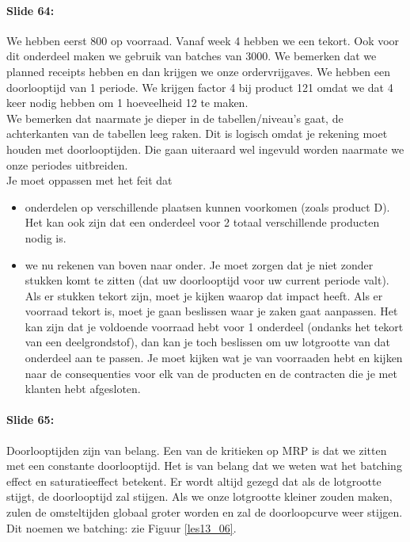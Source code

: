 \documentclass[10pt,a4paper]{report}
\begin{document}
\paragraph{Slide 64:} We hebben eerst 800 op voorraad. Vanaf week 4 hebben we een tekort. Ook voor dit onderdeel maken we gebruik van batches van 3000. We bemerken dat we planned receipts hebben en dan krijgen we onze ordervrijgaves. We hebben een doorlooptijd van 1 periode. We krijgen factor 4 bij product 121 omdat we dat 4 keer nodig hebben om 1 hoeveelheid 12 te maken.\\
We bemerken dat naarmate je dieper in de tabellen/niveau's gaat, de achterkanten van de tabellen leeg raken. Dit is logisch omdat je rekening moet houden met doorlooptijden. Die gaan uiteraard wel ingevuld worden naarmate we onze periodes uitbreiden.\\
Je moet oppassen met het feit dat
\begin{itemize}
\item onderdelen op verschillende plaatsen kunnen voorkomen (zoals product D). Het kan ook zijn dat een onderdeel voor 2 totaal verschillende producten nodig is. 
\item we nu rekenen van boven naar onder. Je moet zorgen dat je niet zonder stukken komt te zitten (dat uw doorlooptijd voor uw current periode valt). Als er stukken tekort zijn, moet je kijken waarop dat impact heeft. Als er voorraad tekort is, moet je gaan beslissen waar je zaken gaat aanpassen. Het kan zijn dat je voldoende voorraad hebt voor 1 onderdeel (ondanks het tekort van een deelgrondstof), dan kan je toch beslissen om uw lotgrootte van dat onderdeel aan te passen. Je moet kijken wat je van voorraaden hebt en kijken naar de consequenties voor elk van de producten en de contracten die je met klanten hebt afgesloten. 
\end{itemize}

\paragraph{Slide 65:} Doorlooptijden zijn van belang. Een van de kritieken op MRP is dat we zitten met een constante doorlooptijd. Het is van belang dat we weten wat het batching effect en saturatieeffect betekent. Er wordt altijd gezegd dat als  de lotgrootte stijgt,  de doorlooptijd zal stijgen. Als we onze lotgrootte kleiner zouden maken, zulen de omsteltijden globaal groter worden en zal de doorloopcurve weer stijgen. Dit noemen we batching: zie Figuur \ref{les13_06}.
\end{document}
